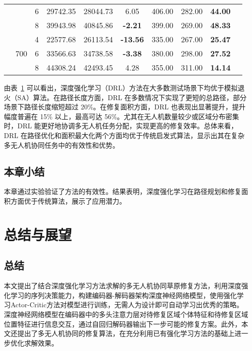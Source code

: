 \documentclass[AutoFakeBold]{LZUThesis}
\begin{document}
\begin{table}[H]
\begin{tabular}{ccc cccc ccc}
		 & & 6 & 29742.35 & 28044.73 & 6.05           & 406.00 & 282.00 & \textbf{44.00} \\
		 & & 8 & 39943.98 & 40845.86 & \textbf{-2.21} & 399.00 & 269.00 & \textbf{48.33} \\
		\cmidrule(lr){2-9}
		 & \multirow{3}{*}{700} 
		   & 4 & 22577.68 & 26113.54 & \textbf{-13.56} & 335.00 & 267.00 & \textbf{25.47} \\
		 & & 6 & 33566.63 & 34738.58 & \textbf{-3.38} & 380.00 & 298.00 & \textbf{27.52} \\
		 & & 8 & 44308.24 & 42493.45 & 4.28           & 355.00 & 311.00 & \textbf{14.14} \\
		\bottomrule
	\end{tabular}
	\label{tab:combined_comparison}
\end{table}

由表~\ref{tab:combined_comparison} 可以看出，深度强化学习（DRL）方法在大多数测试场景下均优于模拟退火（SA）算法。在路径长度方面，DRL 在多数情况下实现了更短的总路径，部分场景下路径长度缩短超过 20\%。在修复面积方面，DRL 也表现出显著提升，提升幅度普遍在 15\% 以上，最高可达 56\%。尤其在无人机数量较少或区域分布密集时，DRL 能更好地协调多无人机任务分配，实现更高的修复效率。总体来看，DRL 在路径优化和面积最大化两个方面均优于传统启发式算法，显示出其在复杂多无人机协同任务中的有效性和优势。


\section{本章小结}
本章通过实验验证了方法的有效性。结果表明，深度强化学习在路径规划和修复面积方面优于传统算法，展示了应用潜力。

\chapter{总结与展望}

\section{总结}
本文提出了结合深度强化学习方法求解的多无人机协同草原修复方法，利用深度强化学习的序列决策能力，构建编码器-解码器架构深度神经网络模型，使用强化学习Actor-Critic方法对模型进行训练，无需人为设计即可自动学习出优秀的策略。深度神经网络模型在编码器中的多头注意力层对待修复区域个体特征和待修复区域位置特征进行信息交互，通过自回归解码器输出下一步可能的修复方案。此外，本文还提出了多无人机协同的修复算法，在充分利用已有强化学习方法的基础上进一步优化求解效果。
\end{document}
